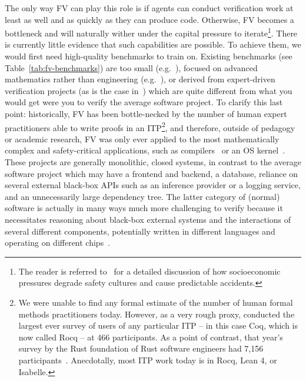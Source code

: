 The only way FV can play this role is if agents can conduct verification work
at least as well and as quickly as they can produce code. Otherwise, FV becomes a bottleneck
and will naturally wither under the capital pressure to iterate\footnote{The reader is referred to~\cite{rasmussen1997risk} for a detailed discussion of how socioeconomic pressures degrade safety cultures and cause predictable accidents.}.
There is currently little evidence that such capabilities are possible.
To achieve them, we would first need high-quality benchmarks to train on.
Existing benchmarks (see Table~\ref{tab:fv-benchmarks}) 
are too small (e.g.~\cite{loughridge2024dafnybench}),
focused on advanced mathematics rather than engineering (e.g.~\cite{glazer2024frontiermath}),
or derived from expert-driven verification projects (as is the case in~\cite{chakraborty2024neural}) which 
are quite different from what you would get were you to verify the average software project.
To clarify this last point: 
    historically, FV has been bottle-necked by the number of human expert practitioners 
    able to write proofs in an ITP\footnote{We were unable to find any formal estimate of the number of human formal methods practitioners today. However, as a very rough proxy, \citet{de2025lessons} conducted the largest ever survey of users of any particular ITP -- in this case Coq, which is now called Rocq -- at 466 participants. As a point of contrast, that year's survey by the Rust foundation of Rust software engineers had 7,156 participants~\cite{rustParticipants}. Anecdotally, most ITP work today is in Rocq, Lean 4, or Isabelle.}, 
    and therefore, outside of pedagogy or academic research, FV was only ever applied to the most 
    mathematically complex and safety-critical applications, such as compilers~\cite{leroy2016compcert} or
    an OS kernel~\cite{klein2009sel4}.
    These projects are generally monolithic, closed systems, 
    in contrast to the average
    software project which may have a frontend and backend, a database, 
    reliance on several external black-box APIs 
    such as an inference provider or a logging service, 
    and an unnecessarily large dependency tree.
The latter category of (normal) software is actually in many ways much more challenging 
to verify because it necessitates reasoning about black-box external systems and 
the interactions of several different components, 
potentially written in different languages 
and operating on different chips~\cite{buro2020equational,perconti2014verifying}.


